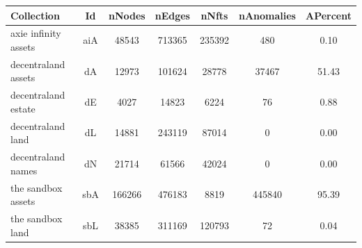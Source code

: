 \begin{tabular}{lcccccc}
\toprule
Collection & Id & nNodes & nEdges & nNfts & nAnomalies & APercent \\
\midrule
axie infinity assets & aiA & 48543 & 713365 & 235392 & 480 & 0.10 \\
decentraland assets & dA & 12973 & 101624 & 28778 & 37467 & 51.43 \\
decentraland estate & dE & 4027 & 14823 & 6224 & 76 & 0.88 \\
decentraland land & dL & 14881 & 243119 & 87014 & 0 & 0.00 \\
decentraland names & dN & 21714 & 61566 & 42024 & 0 & 0.00 \\
the sandbox assets & sbA & 166266 & 476183 & 8819 & 445840 & 95.39 \\
the sandbox land & sbL & 38385 & 311169 & 120793 & 72 & 0.04 \\
\bottomrule
\end{tabular}
